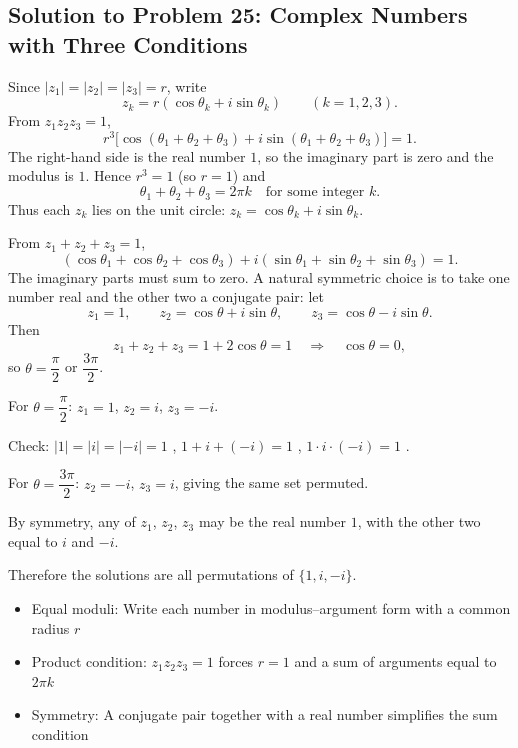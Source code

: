 \subsection{Solution to Problem 25: Complex Numbers with Three Conditions}

\begin{solution}
Since $|z_1| = |z_2| = |z_3| = r$, write
\[
z_k = r(\cos\theta_k + i\sin\theta_k) \qquad (k = 1,2,3).
\]
From $z_1 z_2 z_3 = 1$,
\[
r^3\bigl[\cos(\theta_1 + \theta_2 + \theta_3) + i\sin(\theta_1 + \theta_2 + \theta_3)\bigr] = 1.
\]
The right-hand side is the real number $1$, so the imaginary part is zero and the modulus is $1$. Hence $r^3 = 1$ (so $r = 1$) and
\[
\theta_1 + \theta_2 + \theta_3 = 2\pi k \quad \text{for some integer } k.
\]
Thus each $z_k$ lies on the unit circle: $z_k = \cos\theta_k + i\sin\theta_k$.

From $z_1 + z_2 + z_3 = 1$,
\[
(\cos\theta_1 + \cos\theta_2 + \cos\theta_3) + i(\sin\theta_1 + \sin\theta_2 + \sin\theta_3) = 1.
\]
The imaginary parts must sum to zero. A natural symmetric choice is to take one number real and the other two a conjugate pair: let
\[
z_1 = 1, \qquad z_2 = \cos\theta + i\sin\theta, \qquad z_3 = \cos\theta - i\sin\theta.
\]
Then
\[
z_1 + z_2 + z_3 = 1 + 2\cos\theta = 1
\quad\Longrightarrow\quad
\cos\theta = 0,
\]
so $\theta = \dfrac{\pi}{2}$ or $\dfrac{3\pi}{2}$.

For $\theta = \dfrac{\pi}{2}$: $z_1 = 1$, $z_2 = i$, $z_3 = -i$.

Check: $|1| = |i| = |-i| = 1$ \checkmark, $1 + i + (-i) = 1$ \checkmark, $1 \cdot i \cdot (-i) = 1$ \checkmark.

For $\theta = \dfrac{3\pi}{2}$: $z_2 = -i$, $z_3 = i$, giving the same set permuted.

By symmetry, any of $z_1$, $z_2$, $z_3$ may be the real number $1$, with the other two equal to $i$ and $-i$.

Therefore the solutions are all permutations of $\{1, i, -i\}$.
\end{solution}

\begin{takeaways}
\begin{itemize}
    \item Equal moduli: Write each number in modulus--argument form with a common radius $r$
    \item Product condition: $z_1z_2z_3 = 1$ forces $r = 1$ and a sum of arguments equal to $2\pi k$
    \item Symmetry: A conjugate pair together with a real number simplifies the sum condition
\end{itemize}
\end{takeaways}
